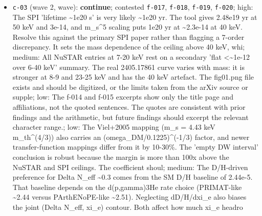 \documentclass[11pt,a4paper]{article}
\begin{document}
\begin{itemize}
  \item \texttt{c-03} (wave 2, wave): \textbf{continue}; contested \texttt{f-017}, \texttt{f-018}, \texttt{f-019}, \texttt{f-020}; high: The SPI 'lifetime \textasciitilde{}1e20 s' is very likely \textasciitilde{}1e20 yr. The tool gives 2.48e19 yr at 50 keV and 3e-14, and m\_s\textasciicircum{}5 scaling puts 1e20 yr at \textasciitilde{}2.3e-14 at 40 keV. Resolve this against the primary SPI paper rather than flagging a 7-order discrepancy. It sets the mass dependence of the ceiling above 40 keV, whi; medium: All NuSTAR entries at 7-20 keV rest on a secondary 'flat \textless{}\textasciitilde{}1e-12 over 6-40 keV' summary. The real 2405.17861 curve varies with mass: it is stronger at 8-9 and 23-25 keV and has the 40 keV artefact. The fig01.png file exists and should be digitized, or the limits taken from the arXiv source or supple; low: The f-014 and f-015 excerpts show only the title page and affiliations, not the quoted sentences. The quotes are consistent with prior findings and the arithmetic, but future findings should excerpt the relevant character range.; low: The Viel+2005 mapping (m\_s = 4.43 keV m\_th\textasciicircum{}(4/3)) also carries an (omega\_DM/0.1225)\textasciicircum{}(-1/3) factor, and newer transfer-function mappings differ from it by 10-30\%. The 'empty DW interval' conclusion is robust because the margin is more than 100x above the NuSTAR and SPI ceilings. The coefficient shoul; medium: The D/H-driven preference for Delta N\_eff \textasciitilde{}0.3 comes from the SM D/H baseline of 2.44e-5. That baseline depends on the d(p,gamma)3He rate choice (PRIMAT-like \textasciitilde{}2.44 versus PArthENoPE-like \textasciitilde{}2.51). Neglecting dD/H/dxi\_e also biases the joint (Delta N\_eff, xi\_e) contour. Both affect how much xi\_e headro

\end{itemize}
\end{document}
